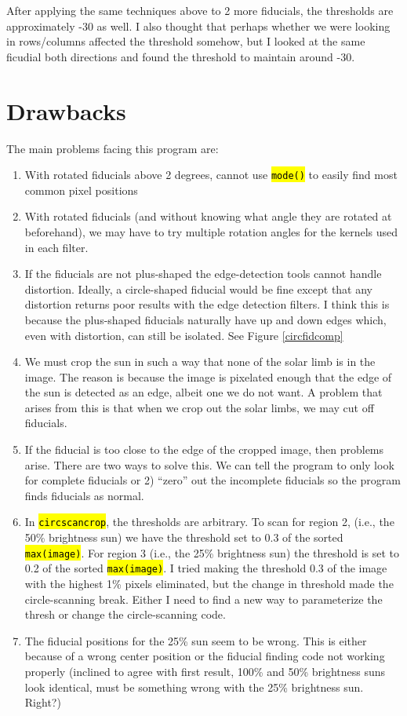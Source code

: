 \documentclass[10pt]{scrartcl}
\begin{document}
After applying the same techniques above to 2 more fiducials, the thresholds are approximately -30 as well. I also thought that perhaps whether we were looking in rows/columns affected the threshold somehow, but I looked at the same ficudial both directions and found the threshold to maintain around -30. 

\section{Drawbacks}

    The main problems facing this program are:

    \begin{enumerate}
        \item With rotated fiducials above 2 degrees, cannot use \hl{\texttt{mode()}} to easily find most common pixel positions
        \item With rotated fiducials (and without knowing what angle they are rotated at beforehand), we may have to try multiple rotation angles for the kernels used in each filter.
        \item If the fiducials are not plus-shaped the edge-detection tools cannot handle distortion. Ideally, a circle-shaped fiducial would be fine except that any distortion returns poor results with the edge detection filters. I think this is because the plus-shaped fiducials naturally have up and down edges which, even with distortion, can still be isolated. See Figure \ref{circfidcomp}
        \item We must crop the sun in such a way that none of the solar limb is in the image. The reason is because the image is pixelated enough that the edge of the sun is detected as an edge, albeit one we do not want. A problem that arises from this is that when we crop out the solar limbs, we may cut off fiducials.
        \item If the fiducial is too close to the edge of the cropped image, then problems arise. There are two ways to solve this. We can tell the program to only look for complete fiducials or 2) ``zero'' out the incomplete fiducials so the program finds fiducials as normal.
        \item In \hl{\texttt{circscancrop}}, the thresholds are arbitrary. To scan for region 2, (i.e., the 50\% brightness sun) we have the threshold set to 0.3 of the sorted \hl{\texttt{max(image)}}. For region 3 (i.e., the 25\% brightness sun) the threshold is set to 0.2 of the sorted \hl{\texttt{max(image)}}. I tried making the threshold 0.3 of the image with the highest 1\% pixels eliminated, but the change in threshold made the circle-scanning break. Either I need to find a new way to parameterize the thresh or change the circle-scanning code. 
        \item The fiducial positions for the 25\% sun seem to be wrong. This is either because of a wrong center position or the fiducial finding code not working properly (inclined to agree with first result, 100\% and 50\% brightness suns look identical, must be something wrong with the 25\% brightness sun. Right?)
    \end{enumerate}
\end{document}
